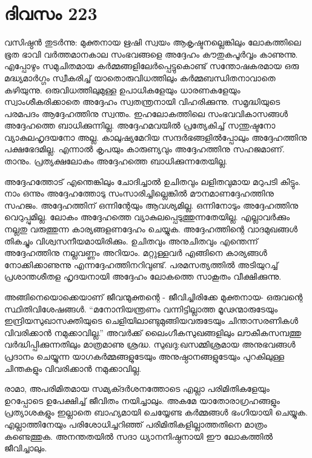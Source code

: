 \section{ദിവസം 223}


വസിഷ്ഠൻ തുടർന്നു: മുക്തനായ ഋഷി സ്വയം ആകൃഷ്ടനല്ലെങ്കിലും ലോകത്തിലെ ഭൂത ഭാവി വർത്തമാനകാല സംഭവങ്ങളെ അദ്ദേഹം കൗതുകപൂർവ്വം കാണുന്നു. എപ്പോഴും സമുചിതമായ കർമ്മങ്ങളിലേർപ്പെട്ടുകൊണ്ട് സന്തോഷകരമായ ഒരു മദ്ധ്യമാർഗ്ഗം സ്വീകരിച്ച് യാതൊരുവിധത്തിലും കർമ്മബന്ധിതനാവാതെ കഴിയുന്നു. ഒരുവിധത്തിലുമുള്ള ഉപാധികളേയും ധാരണകളേയും സ്വാംശീകരിക്കാതെ അദ്ദേഹം സ്വതന്ത്രനായി വിഹരിക്കുന്നു. സമൃദ്ധിയുടെ പരമപദം ആദ്ദേഹത്തിനു സ്വന്തം. ഇഹലോകത്തിലെ സംഭവവികാസങ്ങൾ അദ്ദേഹത്തെ ബാധിക്കുന്നില്ല. അദ്ദേഹമവയിൽ പ്രത്യേകിച്ച് സന്തുഷ്ടനോ വ്യാകുലഹൃദയനോ അല്ല. കാലുഷ്യമേറിയ സന്ദർഭങ്ങളില്‍പ്പോലും അദ്ദേഹത്തിനു പക്ഷഭേദമില്ല. എന്നാൽ കൃപയും കാരുണ്യവും അദ്ദേഹത്തിനു സഹജമാണ്‌. താനും. പ്രത്യക്ഷലോകം അദ്ദേഹത്തെ ബാധിക്കുന്നതേയില്ല.

അദ്ദേഹത്തോട് എന്തെങ്കിലും ചോദിച്ചാൽ ഉചിതവും ലളിതവുമായ മറുപടി കിട്ടും. നാം ഒന്നും അദ്ദേഹത്തോടു സംസാരിച്ചില്ലെങ്കിൽ മൗനമാണദ്ദേഹത്തിനു സഹജം. അദ്ദേഹത്തിന്‌ ഒന്നിന്റേയും ആവശ്യമില്ല. ഒന്നിനോടും അദ്ദേഹത്തിനു വെറുപ്പുമില്ല. ലോകം അദ്ദേഹത്തെ വ്യാകുലപ്പെടുത്തുന്നതേയില്ല. എല്ലാവർക്കും നല്ലതു വരുത്തുന്ന കാര്യങ്ങളണദ്ദേഹം ചെയ്യുക. അദ്ദേഹത്തിന്റെ വാദമുഖങ്ങൾ തികച്ചും വിശ്വസനീയമായിരിക്കും. ഉചിതവും അനുചിതവും എന്തെന്ന് അദ്ദേഹത്തിനു നല്ലവണ്ണം അറിയാം. മറ്റുള്ളവർ എങ്ങിനെ കാര്യങ്ങൾ നോക്കിക്കാണുന്നു എന്നദ്ദേഹത്തിനറിവുണ്ട്. പരമസത്യത്തിൽ അടിയുറച്ച് പ്രശാന്തശീതള ഹൃദയനായി അദ്ദേഹം ലോകത്തെ സാകൂതം വീക്ഷിക്കുന്നു.

അങ്ങിനെയൊക്കെയാണ്‌ ജീവന്മുക്തന്റെ - ജീവിച്ചിരിക്കേ മുക്തനായ- ഒരുവന്റെ സ്ഥിതിവിശേഷങ്ങൾ. “മനോനിയന്ത്രണം വന്നിട്ടില്ലാത്ത മൂഢന്മാരുടേയും ഇന്ദ്രിയസുഖാസക്തിയുടെ ചെളിയിലാണ്ടുമുങ്ങിയവരുടേയും ചിന്താസരണികള്‍ വിവരിക്കാൻ നമുക്കാവില്ല.” അവർക്ക് ലൈംഗീകസുഖങ്ങളിലും ലൗകീകസമ്പത്തു വർദ്ധിപ്പിക്കുന്നതിലും മാത്രമാണു ശ്രദ്ധ. സുഖദു:ഖസമ്മിശ്രമായ അനുഭവങ്ങൾ പ്രദാനം ചെയ്യുന്ന യാഗകർമ്മങ്ങളുടേയും അനുഷ്ഠാനങ്ങളുടേയും പുറകിലുള്ള ചിന്തകളും വിവരിക്കാൻ നമുക്കാവില്ല.

രാമാ, അപരിമിതമായ സമ്യക്ദർശനത്തോടെ എല്ലാ പരിമിതികളേയും ഉറപ്പോടെ ഉപേക്ഷിച്ച് ജീവിതം നയിച്ചാലും. അകമേ യാതോരാഗ്രഹങ്ങളും പ്രത്യാശകളും ഇല്ലാതെ ബാഹ്യമായി ചെയ്യേണ്ട കർമ്മങ്ങൾ ഭംഗിയായി ചെയ്യുക. എല്ലാത്തിനേയും പരിശോധിച്ചറിഞ്ഞ് പരിമിതികളില്ലാത്തതിനെ മാത്രം കണ്ടെത്തുക. അനന്തതയിൽ സദാ ധ്യാനനിഷ്ഠനായി ഈ ലോകത്തിൽ ജീവിച്ചാലും.

